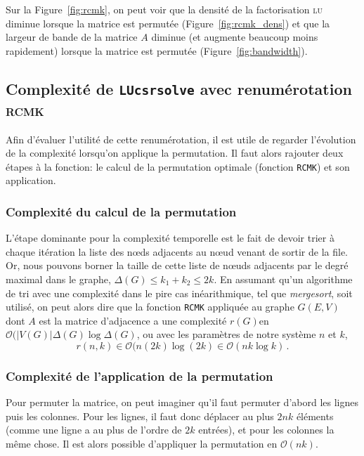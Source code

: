 \documentclass[11pt]{article}
\begin{document}
Sur la Figure~\ref{fig:rcmk}, on peut voir que la densité de la factorisation \textsc{lu} diminue lorsque la matrice est permutée (Figure~\ref{fig:rcmk_dens}) et que la largeur de bande de la matrice $A$ diminue (et augmente beaucoup moins rapidement) lorsque la matrice est permutée (Figure~\ref{fig:bandwidth}).

\subsection{Complexité de \texttt{LUcsrsolve} avec renumérotation \textsc{rcmk}}
Afin d'évaluer l'utilité de cette renumérotation, il est utile de regarder l'évolution de la complexité lorsqu'on applique la permutation. Il faut alors rajouter deux étapes à la fonction: le calcul de la permutation optimale (fonction \lstinline|RCMK|) et son application.
\subsubsection{Complexité du calcul de la permutation}
L'étape dominante pour la complexité temporelle est le fait de devoir trier à chaque itération la liste des n\oe{}ds adjacents au n\oe{}ud venant de sortir de la file. Or, nous pouvons borner la taille de cette liste de n\oe{}uds adjacents par le degré maximal dans le graphe, $\Delta(G) \le k_1+k_2 \le 2k$. En assumant qu'un algorithme de tri avec une complexité dans le pire cas inéarithmique, tel que \emph{mergesort}, soit utilisé, on peut alors dire que la fonction \lstinline|RCMK| appliquée au graphe $G(E, V)$ dont $A$ est la matrice d'adjacence a une complexité $r(G)$en $\mathcal{O}(|V(G)| \Delta(G) \log \Delta(G)$, ou avec les paramètres de notre système $n$ et $k$, 
\[
r(n, k) \in \mathcal{O}(n (2k) \log(2k) \in \mathcal{O}(nk \log k)\,.
\]
\subsubsection{Complexité de l'application de la permutation}
Pour permuter la matrice, on peut imaginer qu'il faut permuter d'abord les lignes puis les colonnes. Pour les lignes, il faut donc déplacer au plus $2nk$ éléments (comme une ligne a au plus de l'ordre de $2k$ entrées), et pour les colonnes la même chose.
Il est alors possible d'appliquer la permutation en $\mathcal{O}(nk)$.
\end{document}

